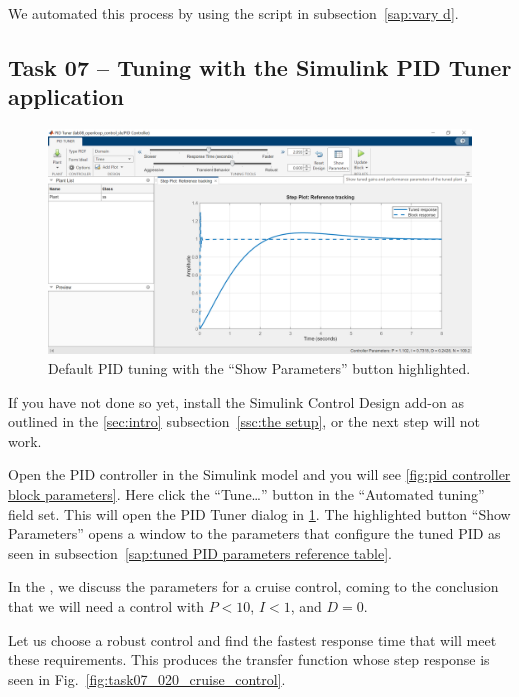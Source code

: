 \documentclass[12pt]{article}
\begin{document}
We automated this process by using the script in  subsection~\ref{sap:vary d}.

\subsection{Task 07 -- Tuning with the Simulink PID Tuner application}\label{ssc:Simulink PID Tuner application}

\begin{figure}
    \centering
    \includegraphics[width=\linewidth]{img/task07_010_default_tuning.png}
    \caption{Default PID tuning with the ``Show Parameters'' button highlighted.}
    \label{fig:task07_010_default_tuning}
\end{figure}

If you have not done so yet,
install the Simulink Control Design add-on as outlined in the \ref{sec:intro} subsection~\ref{ssc:the setup},
or the next step will not work.

Open the PID controller in the Simulink model
and you will see \ref{fig:pid controller block parameters}.
Here click the ``Tune\dots'' button in the ``Automated tuning'' field set. This will open the PID Tuner dialog in \ref{fig:task07_010_default_tuning}.
The highlighted button ``Show Parameters'' opens a window to the parameters that configure the tuned PID
as seen in  subsection~\ref{sap:tuned PID parameters reference table}.

In the , we discuss the parameters for a cruise control, coming to the conclusion that we will need a control with $P < 10$, $I < 1$, and $D = 0$.

Let us choose a robust control and find the fastest response time that will meet these requirements.
This produces the transfer function whose step response is seen in Fig.~\ref{fig:task07_020_cruise_control}.
\end{document}
